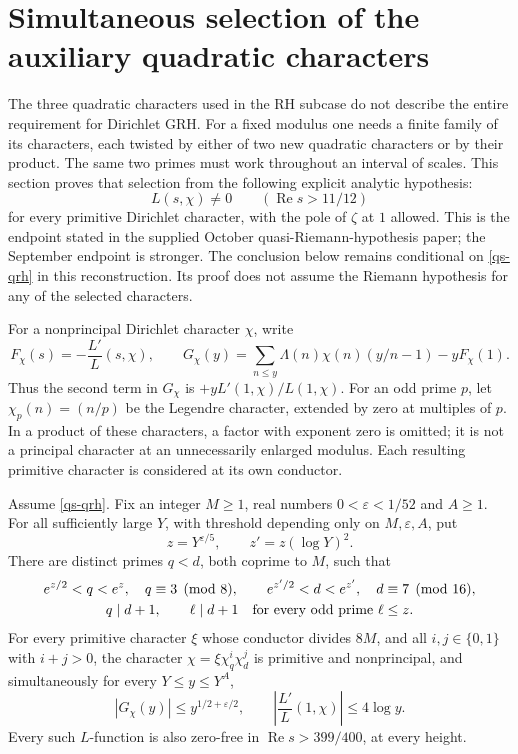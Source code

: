 \section{Simultaneous selection of the auxiliary quadratic characters}
\label{qs-section}

The three quadratic characters used in the RH subcase do not describe
the entire requirement for Dirichlet GRH. For a fixed modulus one needs
a finite family of its characters, each twisted by either of two new
quadratic characters or by their product. The same two primes must work
throughout an interval of scales. This section proves that selection
from the following explicit analytic hypothesis:
\begin{equation}\label{qs-qrh}
 L(s,\chi)\ne0\qquad(\operatorname{Re}s>11/12)
\end{equation}
for every primitive Dirichlet character, with the pole of $\zeta$ at
$1$ allowed. This is the endpoint stated in the supplied October
quasi-Riemann-hypothesis paper; the September endpoint is stronger.
\cite{qrh-october,qrh-september}
The conclusion below remains conditional on \eqref{qs-qrh} in this
reconstruction. Its proof does not assume the Riemann hypothesis for
any of the selected characters.

For a nonprincipal Dirichlet character $\chi$, write
\[
 F_\chi(s)=-\frac{L'}{L}(s,\chi),\qquad
 G_\chi(y)=\sum_{n\le y}\Lambda(n)\chi(n)(y/n-1)-yF_\chi(1).
\]
Thus the second term in $G_\chi$ is
$+yL'(1,\chi)/L(1,\chi)$. For an odd prime $p$, let
$\chi_p(n)=(n/p)$ be the Legendre character, extended by zero at
multiples of $p$. In a product of these characters, a factor with
exponent zero is omitted; it is not a principal character at an
unnecessarily enlarged modulus. Each resulting primitive character
is considered at its own conductor.

\begin{theorem}\label{qs-selection}
Assume \eqref{qs-qrh}. Fix an integer $M\ge1$, real numbers
$0<\varepsilon<1/52$ and $A\ge1$. For all sufficiently large $Y$,
with threshold depending only on $M,\varepsilon,A$, put
\[
 z=Y^{\varepsilon/5},\qquad z'=z(\log Y)^2.
\]
There are distinct primes $q<d$, both coprime to $M$, such that
\begin{gather*}
 e^{z/2}<q<e^z,\quad q\equiv3\pmod8,\qquad
 e^{z'/2}<d<e^{z'},\quad d\equiv7\pmod{16},\\
 q\mid d+1,\qquad
 \ell\mid d+1\quad\hbox{for every odd prime }\ell\le z.
\end{gather*}
For every primitive character $\xi$ whose conductor divides $8M$,
and all $i,j\in\{0,1\}$ with $i+j>0$, the character
$\chi=\xi\chi_q^i\chi_d^j$ is primitive and nonprincipal, and
simultaneously for every $Y\le y\le Y^A$,
\begin{equation}\label{qs-bounds}
 |G_\chi(y)|\le y^{1/2+\varepsilon/2},\qquad
 \left|\frac{L'}{L}(1,\chi)\right|\le4\log y.
\end{equation}
Every such $L$-function is also zero-free in
$\operatorname{Re}s>399/400$, at every height.
\end{theorem}


